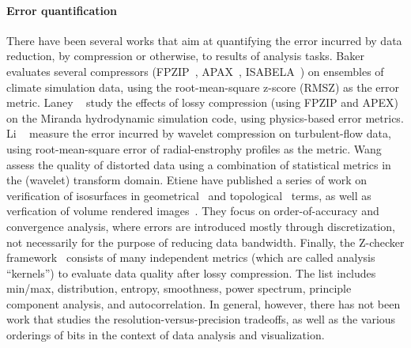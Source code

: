 \paragraph{\textbf{Error quantification}}
There have been several works that aim at quantifying the error incurred by data reduction, by
compression or otherwise, to results of analysis tasks. Baker
\etal~\cite{evaluating-compression-climate} evaluates several compressors (FPZIP~\cite{fpzip},
APAX~\cite{apax}, ISABELA~\cite{isabela}) on ensembles of climate simulation data, using the
root-mean-square z-score (RMSZ) as the error metric. Laney \etal~\cite{compression_sim2013} study
the effects of lossy compression (using FPZIP and APEX) on the Miranda hydrodynamic simulation code,
using physics-based error metrics. Li \etal~\cite{evaluating-efficacy-wavelet} measure the error
incurred by wavelet compression on turbulent-flow data, using root-mean-square error of
radial-enstrophy profiles as the metric. Wang \etal~\cite{statistical-volume-quality} assess the
quality of distorted data using a combination of statistical metrics in the (wavelet) transform
domain. Etiene \etal have published a series of work on verification of isosurfaces in
geometrical~\cite{verifiable-isosurface} and topological~\cite{topology-verification-isosurface}
terms, as well as verfication of volume rendered images~\cite{verifying-volume-rendering}. They
focus on order-of-accuracy and convergence analysis, where errors are introduced mostly through
discretization, not necessarily for the purpose of reducing data bandwidth. Finally, the Z-checker
framework~\cite{z-checker} consists of many independent metrics (which are called analysis
``kernels'') to evaluate data quality after lossy compression. The list includes min/max,
distribution, entropy, smoothness, power spectrum, principle component analysis, and
autocorrelation. In general, however, there has not been work that studies the
resolution-versus-precision tradeoffs, as well as the various orderings of bits in the context of
data analysis and visualization.


